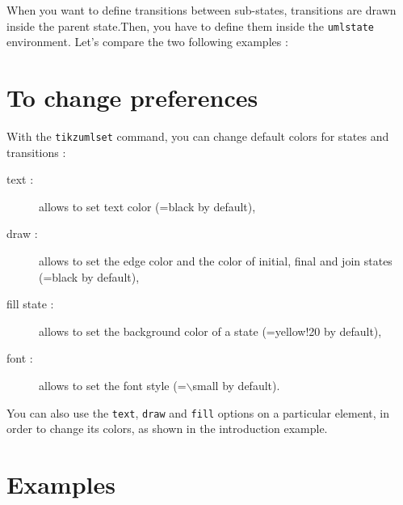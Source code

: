 \documentclass[a4paper,11pt]{report}
\newcommand{\inputTikZ}[1]{%
  }%
\newcommand{\inputTikZ}[1]{%
    \texttt{[image: fig/\#1.pdf]}%
  }%
\begin{document}
When you want to define transitions between sub-states, transitions are drawn inside the parent state.Then, you have to define them inside the {\tt umlstate} environment. Let's compare the two following examples :

\medskip

\begin{minipage}{0.51\textwidth}

\end{minipage}
\begin{minipage}{0.49\textwidth}
\begin{center}
\inputTikZ{transitioninnerbug}
\end{center}
\end{minipage}

\begin{minipage}{0.51\textwidth}

\end{minipage}
\begin{minipage}{0.49\textwidth}
\begin{center}
\inputTikZ{transitioninner}
\end{center}
\end{minipage}

\section{To change preferences}\label{s.fitstatetrans}

With the {\tt tikzumlset} command, you can change default colors for states and transitions :

\begin{description}
\item[text :] allows to set text color (=black by default),
\item[draw :] allows to set the edge color and the color of initial, final and join states (=black by default),
\item[fill state :] allows to set the background color of a state (=yellow!20 by default),
\item[font :] allows to set the font style (=$\backslash$small by default).
\end{description}

You can also use the {\tt text}, {\tt draw} and {\tt fill} options on a particular element, in order to change its colors, as shown in the introduction example.

\section{Examples}
\end{document}

